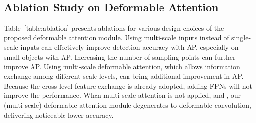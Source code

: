 \documentclass{article}
\begin{document}
\subsection{Ablation Study on Deformable Attention}
\label{sec:ablation}

Table~\ref{table:ablation} presents ablations for various design choices of the proposed deformable attention module. Using multi-scale inputs instead of single-scale inputs can effectively improve detection accuracy with  AP, especially on small objects with  AP. Increasing the number of sampling points  can further improve  AP. Using multi-scale deformable attention, which allows information exchange among different scale levels, can bring additional  improvement in AP. Because the cross-level feature exchange is already adopted, adding FPNs will not improve the performance. When multi-scale attention is not applied, and , our (multi-scale) deformable attention module degenerates to deformable convolution, delivering noticeable lower accuracy.


\setlength{\tabcolsep}{3pt}
\renewcommand{\arraystretch}{1.2}
\begin{table}[ht]
\caption{Ablations for deformable attention on COCO 2017 val set. ``MS inputs'' indicates using multi-scale inputs. ``MS attention'' indicates using multi-scale deformable attention.  is the number of sampling points for each attention head on each feature level.}
\label{table:ablation}
\begin{center}
\small
{}
\end{center}
\vspace{-1em}
\end{table}
\end{document}
